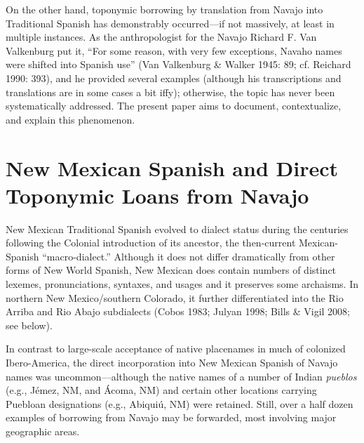 On the other hand, toponymic borrowing by translation from Navajo into Traditional Spanish has demonstrably occurred—if not massively, at least in multiple instances.  As the anthropologist for the Navajo Richard F. Van Valkenburg put it, “For some reason, with very few exceptions, Navaho names were shifted into Spanish use” (Van Valkenburg \& Walker 1945: 89; cf. Reichard 1990: 393), and he provided several examples (although his transcriptions and translations are in some cases a bit iffy); otherwise, the topic has never been systematically addressed.  The present paper aims to document, contextualize, and explain this phenomenon.

\section{New Mexican Spanish and Direct Toponymic Loans from Navajo}\label{jett:sec:3}

New Mexican Traditional Spanish evolved to dialect status during the centuries following the Colonial introduction of its ancestor, the then-current Mexican-Spanish “macro-dialect.”  Although it does not differ dramatically from other forms of New World Spanish, New Mexican does contain numbers of distinct lexemes, pronunciations, syntaxes, and usages and it preserves some archaisms.  In northern New Mexico/southern Colorado, it further differentiated into the Rio Arriba and Rio Abajo subdialects (Cobos 1983; Julyan 1998; Bills \& Vigil 2008; see below).

In contrast to large-scale acceptance of native placenames in much of colonized Ibero-America, the direct incorporation into New Mexican Spanish of Navajo names was uncommon—although the native names of a number of Indian \textit{pueblos} (e.g., Jémez, NM, and Ácoma, NM) and certain other locations carrying Puebloan designations (e.g., Abiquiú, NM) were retained.  Still, over a half dozen examples of borrowing from Navajo may be forwarded, most involving major geographic areas.

